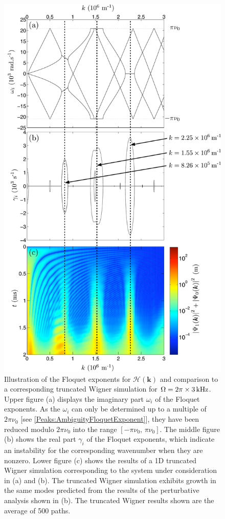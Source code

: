 \begin{figure}
    \centering
    \includegraphics[height=19cm]{CondensateEigenvalues}
    \caption{\label{Peaks:CondensateEigenvalues}
        Illustration of the Floquet exponents for $\mathcal{H}(\bm{k})$ and comparison to a corresponding truncated Wigner simulation for $\Omega = 2\pi \times \unit[3]{kHz}$.
        Upper figure (a) displays the imaginary part $\omega_i$ of the Floquet exponents. As the $\omega_i$ can only be determined up to a multiple of $2\pi\nu_0$ [see \eqref{Peaks:AmbiguityFloquetExponent}], they have been reduced modulo $2\pi\nu_0$ into the range $\left[-\pi\nu_0,\, \pi\nu_0\right]$.
        The middle figure (b) shows the real part $\gamma_i$ of the Floquet exponents, which indicate an instability for the corresponding wavenumber when they are nonzero.
        Lower figure (c) shows the results of a 1D truncated Wigner simulation corresponding to the system under consideration in (a) and (b). The truncated Wigner simulation exhibits growth in the same modes predicted from the results of the perturbative analysis shown in (b). The truncated Wigner results shown are the average of 500 paths.}
\end{figure}

